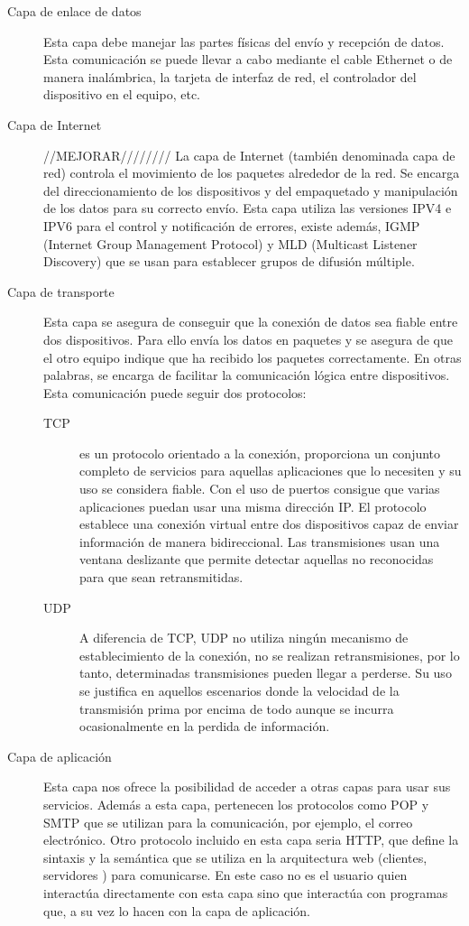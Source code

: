 
\begin{description}
\item[Capa de enlace de datos] 
Esta capa debe manejar las partes físicas del envío y recepción de datos. Esta comunicación se puede llevar a cabo mediante el cable Ethernet o de manera inalámbrica, la tarjeta de interfaz de red, el controlador del dispositivo en el equipo, etc.

\item[Capa de Internet] //MEJORAR////////
La capa de Internet (también denominada capa de red) controla el movimiento de los paquetes alrededor de la red. Se encarga del direccionamiento de los dispositivos y del empaquetado y manipulación de los datos para su correcto envío. Esta capa utiliza las versiones IPV4 e IPV6 para el control y notificación de errores, existe además, IGMP (Internet Group Management Protocol) y MLD (Multicast Listener Discovery) que se usan para establecer grupos de difusión múltiple.

\item[Capa de transporte]
Esta capa se asegura de conseguir que la conexión de datos sea fiable entre dos dispositivos. Para ello envía los datos en paquetes y se asegura de que el otro equipo indique que ha recibido los paquetes correctamente. En otras palabras, se encarga de facilitar la comunicación lógica entre dispositivos. Esta comunicación puede seguir dos protocolos:
	\begin{description}
	\item[TCP] es un protocolo orientado a la conexión, proporciona un conjunto completo de servicios para aquellas aplicaciones que lo necesiten y su uso se considera fiable. Con el uso de puertos consigue que varias aplicaciones puedan usar una misma dirección IP. El protocolo establece
una conexión virtual entre dos dispositivos capaz de enviar información de manera bidireccional. Las transmisiones usan una ventana deslizante que permite detectar aquellas no reconocidas para que
sean retransmitidas.
	\item[UDP] A diferencia de TCP, UDP no utiliza ningún mecanismo de establecimiento de la conexión, no se realizan retransmisiones, por lo tanto, determinadas transmisiones pueden llegar a perderse. Su uso se justifica en aquellos escenarios donde la velocidad de la transmisión prima por encima de todo aunque se incurra ocasionalmente en la perdida de información.
	\end{description}

\item[Capa de aplicación]
Esta capa nos ofrece la posibilidad de acceder a otras capas para usar sus servicios. Además a esta capa, pertenecen los protocolos como POP y SMTP que se utilizan para la comunicación, por ejemplo, el correo electrónico. Otro protocolo incluido en esta capa seria HTTP, que define la sintaxis y la semántica que se utiliza en la arquitectura web (clientes, servidores ) para comunicarse. En este caso no es el usuario quien interactúa directamente con esta capa sino que interactúa con programas que, a su vez lo hacen con la capa de aplicación.
\end{description}
